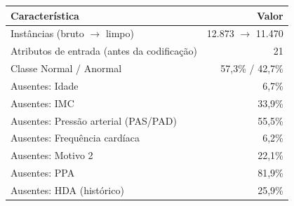 \begin{tabular}{@{}lr@{}}
\toprule
Característica & Valor \\
\midrule
Instâncias (bruto $\rightarrow$ limpo) & 12.873 $\rightarrow$ 11.470 \\
Atributos de entrada (antes da codificação) & 21 \\
Classe Normal / Anormal & 57,3\% / 42,7\% \\
Ausentes: Idade & 6,7\% \\
Ausentes: IMC & 33,9\% \\
Ausentes: Pressão arterial (PAS/PAD) & 55,5\% \\
Ausentes: Frequência cardíaca & 6,2\% \\
Ausentes: Motivo 2 & 22,1\% \\
Ausentes: PPA & 81,9\% \\
Ausentes: HDA (histórico) & 25,9\% \\
\bottomrule
\end{tabular}
